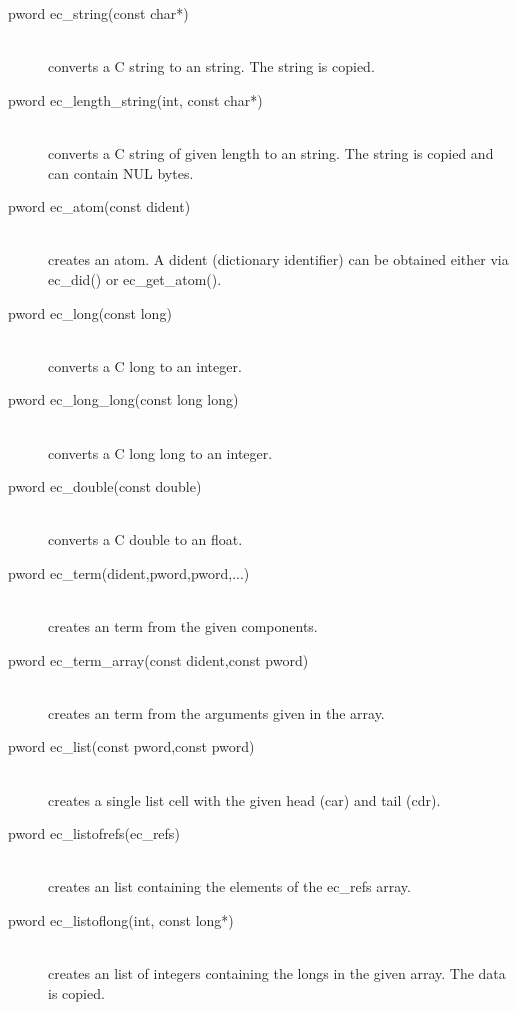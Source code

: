 \begin{description}
\item[pword		ec_string(const char*)]\ \\ 
	converts a C string to an {\eclipse} string. The string is copied.

\item[pword		ec_length_string(int, const char*)]\ \\ 
	converts a C string of given length to an {\eclipse} string.
	The string is copied and can contain NUL bytes.

\item[pword		ec_atom(const dident)]\ \\
	creates an {\eclipse} atom. A dident (dictionary identifier)
	can be obtained either via ec_did() or ec_get_atom().

\item[pword		ec_long(const long)]\ \\
	converts a C long to an {\eclipse} integer.

\item[pword		ec_long_long(const long long)]\ \\
	converts a C long long to an {\eclipse} integer.

\item[pword		ec_double(const double)]\ \\
	converts a C double to an {\eclipse} float.

\item[pword		ec_term(dident,pword,pword,...)]\ \\
	creates an {\eclipse} term from the given components.

\item[pword		ec_term_array(const dident,const pword\nil)]\ \\
	creates an {\eclipse} term from the arguments given in the array.

\item[pword		ec_list(const pword,const pword)]\ \\
	creates a single {\eclipse} list cell with the given head (car) and tail (cdr).

\item[pword		ec_listofrefs(ec_refs)]\ \\
	creates an {\eclipse} list containing the elements of the ec_refs array.

\item[pword		ec_listoflong(int, const long*)]\ \\
	creates an {\eclipse} list of integers containing the longs in the given array.
	The data is copied.


\end{description}
